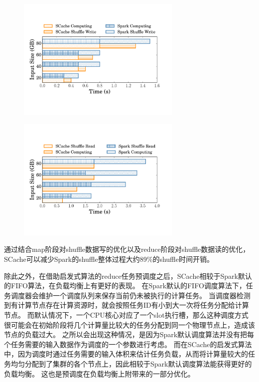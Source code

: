 \begin{figure}[!htp]
	\centering
	\includegraphics[width=0.7\textwidth]{../../PPoPP-2018/fig/groupbymaptask.pdf}
\end{figure}

\begin{figure}[!htp]
	\centering
	\includegraphics[width=0.7\textwidth]{../../PPoPP-2018/fig/groupbyreducetask.pdf}
\end{figure}


通过结合map阶段对shuffle数据写的优化以及reduce阶段对shuffle数据读的优化，SCache可以减少Spark的shuffle整体过程大约89\%的shuffle时间开销。

除此之外，在借助启发式算法的reduce任务预调度之后，SCache相较于Spark默认的FIFO算法，在负载均衡上有更好的表现。
在Spark默认的FIFO调度算法下，任务调度器会维护一个调度队列来保存当前仍未被执行的计算任务。
当调度器检测到有计算节点存在计算资源时，就会按照任务ID有小到大一次将任务分配给计算节点。
而默认情况下，一个CPU核心对应了一个slot执行槽，那么这种调度方式很可能会在初始阶段将几个计算量比较大的任务分配到同一个物理节点上，造成该节点的负载过大。
之所以会出现这种情况，是因为Spark默认调度算法并没有把每个任务需要的输入数据作为调度的一个参数进行考虑。
而在SCache的启发式算法中，因为调度时通过任务需要的输入体积来估计任务负载，从而将计算量较大的任务均匀分配到了集群的各个节点上，因此相较于Spark默认调度算法能获得更好的负载均衡。
这也是预调度在负载均衡上附带来的一部分优化。

